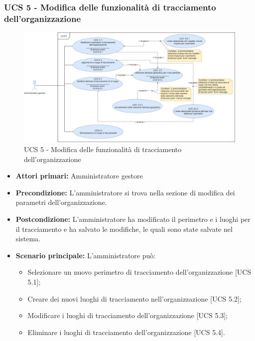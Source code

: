 \subsubsection{UCS 5 - Modifica delle funzionalità di tracciamento dell'organizzazione}%
\begin{figure}[h]
	\centering
    \includegraphics[scale=0.40]{sezioni/UseCase/Immagini/UCS5.png}
    \caption{UCS 5 - Modifica delle funzionalità di tracciamento dell'organizzazione}
\end{figure}
\begin{itemize}
    \item \textbf{Attori primari:} Amministratore gestore
    \item \textbf{Precondizione:} L'amministratore si trova nella sezione di modifica dei parametri dell'organizzazione.
    \item \textbf{Postcondizione:} L'amministratore ha modificato il perimetro e i luoghi per il tracciamento e ha salvato le modifiche, le quali sono state salvate nel sistema.
    \item \textbf{Scenario principale:} L'amministratore può:
    \begin{itemize}    
        \item Selezionare un nuovo perimetro di tracciamento dell'organizzazione [UCS 5.1];
        \item Creare dei nuovi luoghi di tracciamento nell'organizzazione [UCS 5.2];
        \item Modificare i luoghi di tracciamento dell'organizzazione [UCS 5.3];
        \item Eliminare i luoghi di tracciamento dell'organizzazione [UCS 5.4].
    \end{itemize}
\end{itemize}

